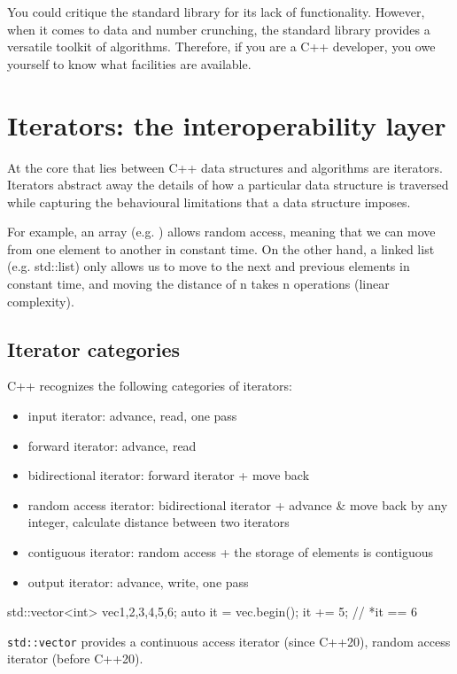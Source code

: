 You could critique the \CC standard library for its lack of functionality. However, when it comes to data and number crunching, the \CC standard library provides a versatile toolkit of algorithms. Therefore, if you are a C++ developer, you owe yourself to know what facilities are available.




\section{Iterators: the interoperability layer}

At the core that lies between C++ data structures and algorithms are iterators. Iterators abstract away the details of how a particular data structure is traversed while capturing the behavioural limitations that a data structure imposes.

For example, an array (e.g. \emph{}) allows random access, meaning that we can move from one element to another in constant time. On the other hand, a linked list (e.g. std::list) only allows us to move to the next and previous elements in constant time, and moving the distance of n takes n operations (linear complexity).

\subsection{Iterator categories}

C++ recognizes the following categories of iterators:

\begin{itemize}
    \item \gls{input iterator}: advance, read, one pass
    \item \gls{forward iterator}: advance, read
    \item \gls{bidirectional iterator}: forward iterator + move back
    \item \gls{random access iterator}: bidirectional iterator + advance \& move back by any integer, calculate distance between two iterators
    \item \gls{contiguous iterator}: random access + the storage of elements is contiguous
    \item \gls{output iterator}: advance, write, one pass
\end{itemize}

\begin{box-note}
\begin{cppcode}
std::vector<int> vec{1,2,3,4,5,6};
auto it = vec.begin();
it += 5; // *it == 6
\end{cppcode}
\noindent\small\texttt{std::vector} provides a continuous access iterator (since C++20), random access iterator (before C++20).
\end{box-note}


